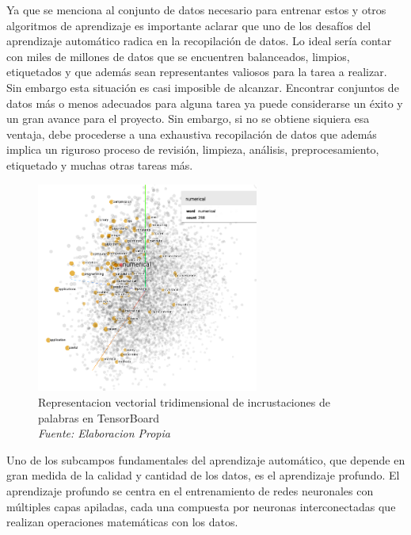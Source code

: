 Ya que se menciona al conjunto de datos necesario para entrenar estos y otros algoritmos de aprendizaje es importante aclarar que uno de los desafíos del aprendizaje automático radica en la recopilación de datos. Lo ideal sería contar con miles de millones de datos que se encuentren balanceados, limpios, etiquetados y que además sean representantes valiosos para la tarea a realizar. Sin embargo esta situación es casi imposible de alcanzar. Encontrar conjuntos de datos más o menos adecuados para alguna tarea ya puede considerarse un éxito y un gran avance para el proyecto. Sin embargo, si no se obtiene siquiera esa ventaja, debe procederse a una exhaustiva recopilación de datos que además implica un riguroso proceso de revisión, limpieza, análisis, preprocesamiento, etiquetado y muchas otras tareas más.

\begin{figure}
	\includegraphics[width=0.65\textwidth]{capitulo2/figuras/an1.png}
	\caption{Representacion vectorial tridimensional de incrustaciones de palabras en TensorBoard
	\\\textit{Fuente: Elaboracion Propia}}

	\label{fig:tensorboard}
\end{figure}

Uno de los subcampos fundamentales del aprendizaje automático, que depende en gran medida de la calidad y cantidad de los datos, es el aprendizaje profundo. El aprendizaje profundo se centra en el entrenamiento de redes neuronales con múltiples capas apiladas, cada una compuesta por neuronas interconectadas que realizan operaciones matemáticas con los datos.

